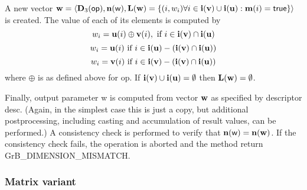 A new vector ${\bf w} = \langle \bold{D}_3({\sf op}),
\bold{n}({\bf \sf w}), \bold{L}({\bf w}) = \{(i,w_i)  \forall i \in
{\bf i}({\bf v}) \cup {\bf i}({\bf u}) : {\bf m}(i)
= {\sf true} \} \rangle$ is created.  The value of each of its
elements is computed by 
\[
w_i = {\bf u}(i) \oplus {\bf v}(i), \ \mbox{if}\  i \in  {\bf i}({\bf v}) \cap {\bf i}({\bf u})
\]
\[
w_i = {\bf u}(i) \ \mbox{if}\  i \in  {\bf i}({\bf u}) - ({\bf i}({\bf v}) \cap {\bf i}({\bf u}))
\]
\[
w_i = {\bf v}(i) \ \mbox{if}\  i \in  {\bf i}({\bf v}) - ({\bf i}({\bf v}) \cap {\bf i}({\bf u}))
\]
where $\oplus$ is as defined above for {\sf op}.
If ${\bf i}({\bf v}) \cup {\bf i}({\bf u}) = \emptyset$
then $\bold{L}({\bf w}) = \emptyset$.

Finally, output parameter {\sf w} is computed from vector ${\bf w}$
as specified by descriptor {\sf desc}. (Again, in the simplest case this
is just a copy, but additional postprocessing, including casting and
accumulation of result values, can be performed.)  A consistency check is
performed to verify that $\bold{n}({\sf w}) = \bold{n}({\bf w})$. If
the consistency check fails, the operation is aborted and the method
return {\sf GrB\_DIMENSION\_MISMATCH}.


\subsubsection{Matrix variant}


\paragraph{\syntax}

